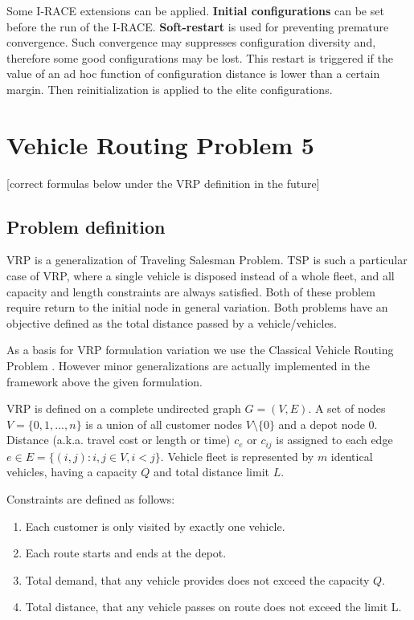\documentclass[11pt,a4paper,oneside]{book}
\begin{document}
Some I-RACE extensions can be applied. \textbf{Initial configurations} can be set before the run of the I-RACE. \textbf{Soft-restart} is used for preventing premature convergence. Such convergence may suppresses configuration diversity and, therefore some good configurations may be lost. This restart is triggered if the value of an ad hoc function of configuration distance is lower than a certain margin. Then reinitialization is applied to the elite configurations.


\chapter{Vehicle Routing Problem 5}


[correct formulas below under the VRP definition in the future] \newline

\section{Problem definition}

VRP is a generalization of Traveling Salesman Problem. TSP is such a particular case of VRP, where a single vehicle is disposed instead of a whole fleet, and all capacity and length constraints are always satisfied. Both of these problem require return to the initial node in general variation. Both problems have an objective defined as the total distance passed by a vehicle/vehicles.

As a basis for VRP formulation variation we use the Classical Vehicle Routing Problem \cite{CORDEAU2007367}. However minor generalizations are actually implemented in the framework above the given formulation. \par

VRP is defined on a complete undirected graph $G=(V,E)$. A set of nodes $V=\{0,1,...,n\}$ is a union of all customer nodes $V\setminus\{0\}$ and a depot node $0$. Distance (a.k.a. travel cost or length or time) $c_e$ or $c_{ij}$ is assigned to each edge $e \in E = \{(i,j): i,j \in V, i<j\}$. Vehicle fleet is represented by $m$ identical vehicles, having a capacity $Q$ and total distance limit $L$.

Constraints are defined as follows:
\begin{enumerate}
\item Each customer is only visited by exactly one vehicle.
\item Each route starts and ends at the depot.
\item Total demand, that any vehicle provides does not exceed the capacity $Q$.
\item Total distance, that any vehicle passes on route does not exceed the limit L. 
\end{enumerate}
\end{document}
